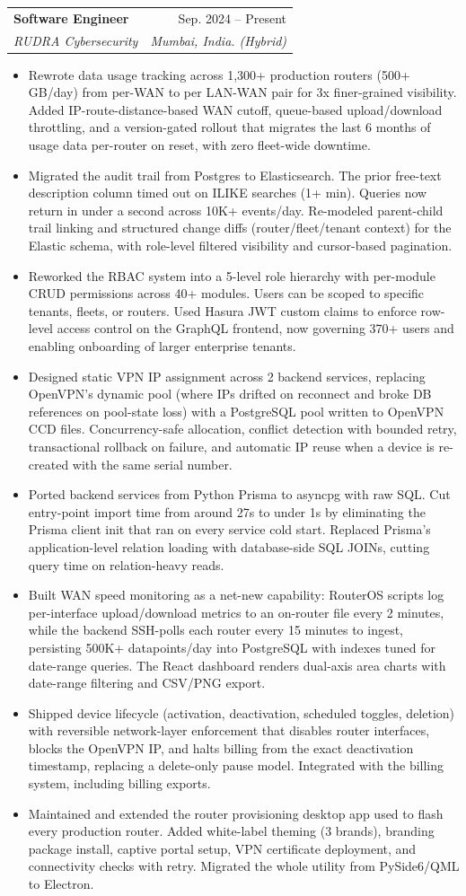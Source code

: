\documentclass[letterpaper,11pt]{article}
\makeatletter
\newcommand{\resumeItem}[1]{
  \item\small{
    {#1 \vspace{-2pt}}
  }
}
\newcommand{\resumeSubheading}[4]{
  \vspace{-2pt}\item
    \begin{tabular*}{0.97\textwidth}[t]{l@{\extracolsep{\fill}}r}
      \textbf{#1} & #2 \\
      \textit{\small#3} & \textit{\small #4} \\
    \end{tabular*}\vspace{-7pt}
}
\newcommand{\resumeItemListStart}{\begin{itemize}}
\newcommand{\resumeItemListEnd}{\end{itemize}\vspace{-7pt}}
\makeatother
\begin{document}
    \resumeSubheading
      {Software Engineer}{Sep. 2024 -- Present}
      {RUDRA Cybersecurity}{Mumbai, India. (Hybrid)}
      \resumeItemListStart
        \resumeItem{Rewrote data usage tracking across 1,300+ production routers (500+ GB/day) from per-WAN to per LAN-WAN pair for 3x finer-grained visibility. Added IP-route-distance-based WAN cutoff, queue-based upload/download throttling, and a version-gated rollout that migrates the last 6 months of usage data per-router on reset, with zero fleet-wide downtime.}
        \resumeItem{Migrated the audit trail from Postgres to Elasticsearch. The prior free-text description column timed out on ILIKE searches (1+ min). Queries now return in under a second across 10K+ events/day. Re-modeled parent-child trail linking and structured change diffs (router/fleet/tenant context) for the Elastic schema, with role-level filtered visibility and cursor-based pagination.}
        \resumeItem{Reworked the RBAC system into a 5-level role hierarchy with per-module CRUD permissions across 40+ modules. Users can be scoped to specific tenants, fleets, or routers. Used Hasura JWT custom claims to enforce row-level access control on the GraphQL frontend, now governing 370+ users and enabling onboarding of larger enterprise tenants.}
        \resumeItem{Designed static VPN IP assignment across 2 backend services, replacing OpenVPN's dynamic pool (where IPs drifted on reconnect and broke DB references on pool-state loss) with a PostgreSQL pool written to OpenVPN CCD files. Concurrency-safe allocation, conflict detection with bounded retry, transactional rollback on failure, and automatic IP reuse when a device is re-created with the same serial number.}
        \resumeItem{Ported backend services from Python Prisma to asyncpg with raw SQL. Cut entry-point import time from around 27s to under 1s by eliminating the Prisma client init that ran on every service cold start. Replaced Prisma's application-level relation loading with database-side SQL JOINs, cutting query time on relation-heavy reads.}
        \resumeItem{Built WAN speed monitoring as a net-new capability: RouterOS scripts log per-interface upload/download metrics to an on-router file every 2 minutes, while the backend SSH-polls each router every 15 minutes to ingest, persisting 500K+ datapoints/day into PostgreSQL with indexes tuned for date-range queries. The React dashboard renders dual-axis area charts with date-range filtering and CSV/PNG export.}
        \resumeItem{Shipped device lifecycle (activation, deactivation, scheduled toggles, deletion) with reversible network-layer enforcement that disables router interfaces, blocks the OpenVPN IP, and halts billing from the exact deactivation timestamp, replacing a delete-only pause model. Integrated with the billing system, including billing exports.}
        \resumeItem{Maintained and extended the router provisioning desktop app used to flash every production router. Added white-label theming (3 brands), branding package install, captive portal setup, VPN certificate deployment, and connectivity checks with retry. Migrated the whole utility from PySide6/QML to Electron.}
      \resumeItemListEnd
\end{document}
